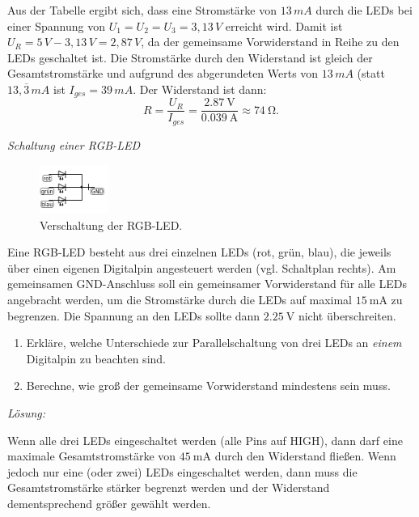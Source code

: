 \documentclass[ngerman, 11pt]{scrreprt}
\begin{document}
	\medskip
	Aus der Tabelle ergibt sich, dass eine Stromstärke von $13\,mA$ durch die LEDs bei einer Spannung von $U_1 = U_2 = U_3 = 3,13\,V$ erreicht wird. Damit ist $U_R=5\,V - 3,13\,V = 2,87\,V$, da der gemeinsame Vorwiderstand in Reihe zu den LEDs geschaltet ist. Die Stromstärke durch den Widerstand ist gleich der Gesamtstromstärke und aufgrund des abgerundeten Werts von $13\,mA$ (statt $13,\overline{3}\,mA$ ist $I_{ges}=39\,mA$. Der Widerstand ist dann:
	\begin{equation*}
		R=\frac{U_R}{I_{ges}}=\frac{\SI{2,87}{\volt}}{\SI{0,039}{\ampere}} \approx \SI{74}{\ohm}.
	\end{equation*}
	\bigskip
	
	\begin{aufgabe} \emph{Schaltung einer RGB-LED}
		
		\begin{figure}
			\vspace{-\baselineskip}
			\centering
			\includegraphics[width=0.2\textwidth]{../pics/rgb-led-schaltplan.png}
			\caption{Verschaltung der RGB-LED.}
			\vspace{-\baselineskip}
		\end{figure}
		Eine RGB-LED besteht aus drei einzelnen LEDs (rot, grün, blau), die jeweils über einen eigenen Digitalpin angesteuert werden (vgl. Schaltplan rechts). Am gemeinsamen GND-Anschluss soll ein gemeinsamer Vorwiderstand für alle LEDs angebracht werden, um die Stromstärke durch die LEDs auf maximal $\SI{15}{\milli\ampere}$ zu begrenzen. Die Spannung an den LEDs sollte dann $\SI{2,25}{\volt}$ nicht überschreiten.
		\begin{enumerate}[label=\alph*), itemsep=0ex]
			\item Erkläre, welche Unterschiede zur Parallelschaltung von drei LEDs an \emph{einem} Digitalpin zu beachten sind.
			\item Berechne, wie groß der gemeinsame Vorwiderstand mindestens sein muss.
		\end{enumerate}
	\end{aufgabe}
	
	\bigskip
	\emph{Lösung:}
	
	Wenn alle drei LEDs eingeschaltet werden (alle Pins auf HIGH), dann darf eine maximale Gesamtstromstärke von $\SI{45}{\milli\ampere}$ durch den Widerstand fließen. Wenn jedoch nur eine (oder zwei) LEDs eingeschaltet werden, dann muss die Gesamtstromstärke stärker begrenzt werden und der Widerstand dementsprechend größer gewählt werden. 
	
\end{document}
